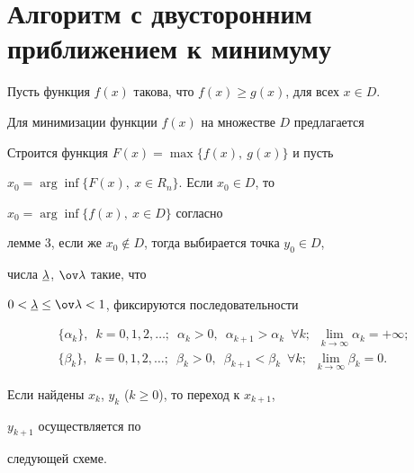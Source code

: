  


\section{Алгоритм с двусторонним приближением к минимуму} 


 


Пусть функция $f(x)$ такова, что $f(x)\ge g(x)$, для всех $x\in D$. 


Для минимизации функции $f(x)$ на множестве $D$ предлагается 


 


\begin{alg} Строится функция $F(x)=\max\{f(x),\ g(x)\}$ и пусть 


$x_0=\arg\inf\{F(x),\ x\in R_n\}$. Если $x_0\in D$, то 


$x_0=\arg\inf\{f(x),\ x\in D\}$ согласно 


лемме 3, если же $x_0\notin D$, тогда выбирается точка $y_0\in D$, 


числа $\underline\lambda$, $\ov\lambda$ такие, что 


$0<\ul\lambda\le\ov\lambda<1$, фиксируются последовательности 


\begin{gather*} 


\{\alpha_k\},\ \;k=0,1,2,\dotsc;\ \;\alpha_k>0, 


\ \;\alpha_{k+1}>\alpha_k\ \;\forall k; 


\ \;\lim_{k\to\infty}\alpha_k=+\infty;\\


% 


\{\beta_k\},\ \;k=0,1,2,\dotsc;\ \;\beta_k>0, 


\ \;\beta_{k+1}<\beta_k\ \;\forall k; 


\ \;\lim_{k\to\infty}\beta_k=0.


\end{gather*} 


 


Если найдены $x_k$, $y_k$ ($k\ge 0$), то переход к $x_{k+1}$, 


$y_{k+1}$ осуществляется по 


следующей схеме. 


\end{alg}
